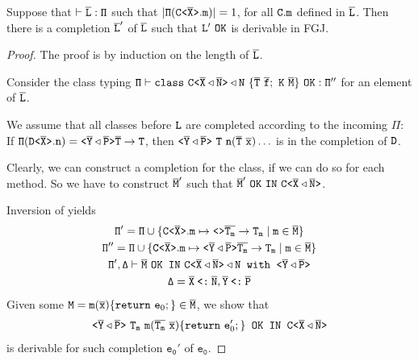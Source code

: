 \begin{theorem}
  Suppose that $\mathtt{\vdash \overline{\tt L} : \Pi}$ such that $|\mathtt{\Pi (\mathtt{C \texttt{<} \overline{\tt X} \texttt{>} }.m)}| = 1$, for all ${\tt C.m}$ defined in $\overline{\tt L}$. Then there is a completion $\overline{\tt L}'$ of $\overline{\tt L}$ such that
  $\mv{L}'\ \mathtt{OK}$ is derivable in FGJ. 
\end{theorem}
\begin{proof}
  The proof is by induction on the length of $\overline{\tt L}$.

  Consider the class typing $\mathtt{ \Pi \vdash \texttt{class}\ \mathtt{C \texttt{<} \overline{\tt X} 
        \triangleleft \overline{\tt N} \texttt{>} } \triangleleft N\ \{ \overline{\tt T} \
      \overline{\tt f}; \ K \ \overline{\tt M} \} \ \texttt{OK} : \Pi''}$ for an element of $\overline{\tt L}$.

    We assume that all classes before ${\tt L}$ are completed according to the incoming $\mathtt{\Pi}$:
    If $\mathtt{\Pi (\mathtt{D \texttt{<} \overline{\tt X} \texttt{>} }.n)} = \mathtt{\mathtt{ \texttt{<} \overline{\tt Y} \triangleleft  \overline{\tt P} \texttt{>} }
      \overline{\tt T} \to T}$, then $\mathtt{\exptype{}{\ol{Y} \triangleleft  \ol{P}}\ T\ \mv{n}(\ol{T}\
      \ol{x}) \dots}$ is in the completion of ${\tt D}$.

    Clearly, we can construct a completion for the class, if we can do so for each method. So we
    have to construct $\overline{\tt M}'$ such that $\mathtt{\ol{M}'\ \mathtt{OK\ IN}\ \exptype{C}{\ol{X} 
        \triangleleft \ol{N}}}$. 

    Inversion of  yields
    \begin{gather}
      \label{eq:3}
      \mathtt{\Pi' = \Pi \cup \{ \mathtt{C \texttt{<} \overline{\tt X} \texttt{>} }.m \mapsto \mathtt{ \texttt{<}  \texttt{>} } \overline{\tt T_m} \to T_m \mid m \in \overline{\tt M} \} } \\
      \mathtt{\Pi'' = \Pi \cup \{ \mathtt{C \texttt{<} \overline{\tt X} \texttt{>} }.m \mapsto
          \mathtt{ \texttt{<} \overline{\tt Y} \triangleleft  \overline{\tt P} \texttt{>} } \overline{\tt T_m} \to T_m \mid m \in \overline{\tt M} \} } \\
      \label{eq:5}
      \mathtt{\Pi', \Delta \vdash \overline{\tt M} \ \texttt{OK IN}\
        \mathtt{C \texttt{<} \overline{\tt X} \triangleleft \overline{\tt N} \texttt{>} } \triangleleft N  \texttt{
          with } \mathtt{ \texttt{<} \overline{\tt Y} \triangleleft  \overline{\tt P} \texttt{>} }} \\
      \label{eq:7}
      \mathtt{\Delta = \overline{\tt X} \mathbin{\texttt{<:}}  \overline{\tt N}, \overline{\tt Y} \mathbin{\texttt{<:}}  \overline{\tt P}}
    \end{gather}
    Given some ${\tt M} = \texttt{m}(\overline{\tt \mathtt{x}}) \{\texttt{return}\ \mathtt{e}_0;\} \in \overline{\tt M}$,
    we show that
    \begin{gather}
      \label{eq:4}
      \exptype{}{\ol{Y} \triangleleft  \ol{P}}\ \mathtt{T_m}\ \texttt{m}(\ol{T_m}\ \ol{{x}})
      \{\texttt{return}\ \mathtt{e}'_0;\} \texttt{ OK IN }\exptype{C}{\ol{X} \triangleleft \ol{N}}
    \end{gather}
    is derivable for such completion $\mathtt{e_0'}$ of $\mathtt{e_0}$.


\end{proof}

